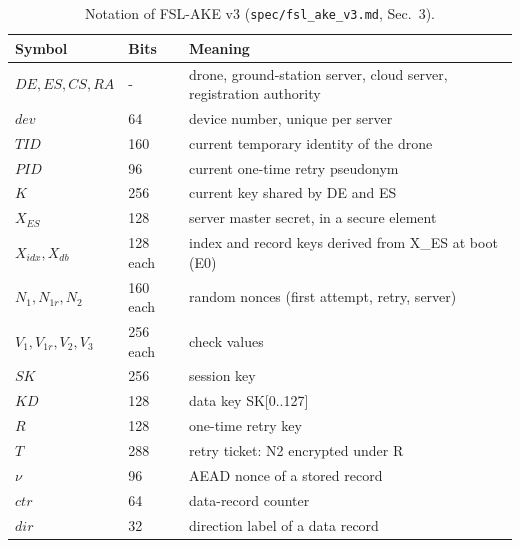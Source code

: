 \begin{table}[!htbp]
\centering
\footnotesize
\caption{Notation of FSL-AKE v3 (\texttt{spec/fsl\_ake\_v3.md}, Sec.~3).}
\label{tab:notation}
\setlength{\tabcolsep}{3pt}
\begin{tabular}{p{2.1cm}lp{4.5cm}}
\toprule
Symbol & Bits & Meaning  \\
\midrule
$DE, ES, CS, RA$ & - & drone, ground-station server, cloud server, registration authority   \\
$dev$ & 64 & device number, unique per server \\
$TID$ & 160 & current temporary identity of the drone \\
$PID$ & 96 & current one-time retry pseudonym \\
$K$ & 256 & current key shared by DE and ES  \\
$X_{ES}$ & 128 & server master secret, in a secure element \\
$X_{idx}, X_{db}$ & 128 each & index and record keys derived from X\_ES at boot (E0) \\
$N_1, N_{1r}, N_2$ & 160 each & random nonces (first attempt, retry, server) \\
$V_1, V_{1r}, V_2, V_3$ & 256 each & check values \\
$SK$ & 256 & session key \\
$KD$ & 128 & data key SK[0..127]  \\
$R$ & 128 & one-time retry key \\
$T$ & 288 & retry ticket: N2 encrypted under R \\
$\nu $ & 96 & AEAD nonce of a stored record  \\
$ctr$ & 64 & data-record counter  \\
$dir$ & 32 & direction label of a data record  \\
\bottomrule
\end{tabular}
\end{table}